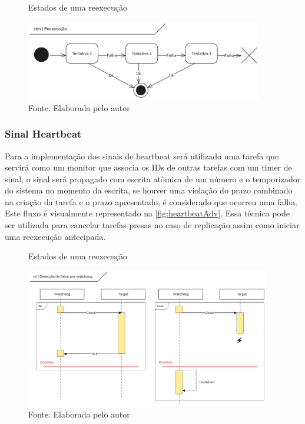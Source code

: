 \begin{figure}[H]
    \centering
    \captionsetup{justification=centering}
    \caption{Estados de uma reexecução}
    \includegraphics[width=0.925\textwidth]{assets/state_reexec.png}
    \captionsetup{justification=raggedright}
    \caption*{Fonte: Elaborada pelo autor}
    \label{fig:stateReexec}
\end{figure}

\subsubsection{Sinal Heartbeat}

Para a implementação dos sinais de heartbeat será utilizado uma tarefa que servirá como um monitor que associa os IDs de outras tarefas com um timer de sinal, o sinal será propagado com escrita atômica de um número e o temporizador do sistema no momento da escrita, se houver uma violação do prazo combinado na criação da tarefa e o prazo apresentado, é considerado que ocorreu uma falha. Este fluxo é visualmente representado na \autoref{fig:heartbeatAdv}. Essa técnica pode ser utilizada para cancelar tarefas presas no caso de replicação assim como iniciar uma reexecução antecipada.

\begin{figure}[H]
    \centering
    \captionsetup{justification=centering}
    \caption{Estados de uma reexecução}
    \includegraphics[width=0.95\textwidth]{assets/heartbeat_signal.png} %
    \captionsetup{justification=raggedright}
    \caption*{Fonte: Elaborada pelo autor}
    \label{fig:heartbeatAdv}
\end{figure}

